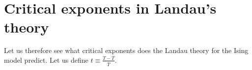 \documentclass[../../Main/Main.tex]{subfiles}
\begin{document}
\begin{figure}[H]
\begin{minipage}[c]{0.5\linewidth}
\end{minipage}
\begin{minipage}[]{0.5\linewidth}
\centering
{}
\end{minipage}
\end{figure}



\section{Critical exponents in Landau's theory}
Let us therefore see what critical exponents does the Landau theory for the Ising model predict. Let us define \( t \equiv \frac{T- \bar{T} }{\bar{T} } \).
\end{document}
